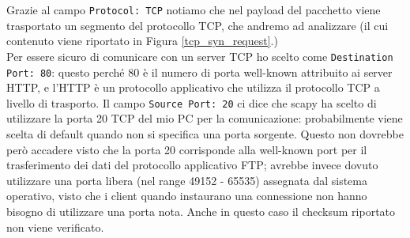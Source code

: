 \documentclass[12pt,a4paper]{report}
\begin{document}
Grazie al campo \texttt{Protocol: TCP} notiamo che nel payload del pacchetto viene trasportato un segmento del protocollo TCP, che andremo ad analizzare (il cui contenuto viene riportato in Figura \ref{tcp_syn_request}.) \\
Per essere sicuro di comunicare con un server TCP ho scelto come \texttt{Destination Port: 80}: questo perché 80 è il numero di porta well-known attribuito ai server HTTP, e l'HTTP è un protocollo applicativo che utilizza il protocollo TCP a livello di trasporto.
Il campo \texttt{Source Port: 20} ci dice che scapy ha scelto di utilizzare la porta 20 TCP del mio PC per la comunicazione: probabilmente viene scelta di default quando non si specifica una porta sorgente.
Questo non dovrebbe però accadere visto che la porta 20 corrisponde alla well-known port per il trasferimento dei dati del protocollo applicativo FTP; avrebbe invece dovuto utilizzare una porta libera (nel range 49152 - 65535) assegnata dal sistema operativo, visto che i client quando instaurano una connessione non hanno bisogno di utilizzare una porta nota. Anche in questo caso il checksum riportato non viene verificato.
\end{document}
